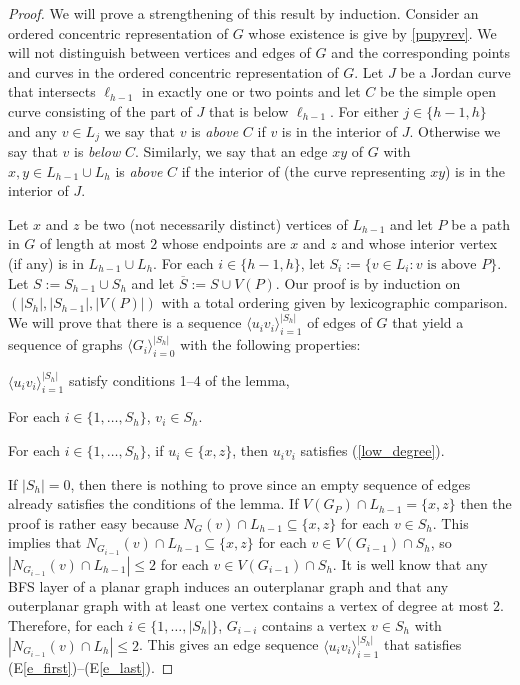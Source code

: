 \documentclass{patmorin}
\begin{document}
\begin{proof}
  We will prove a strengthening of this result by induction.  Consider an ordered concentric representation of $G$ whose existence is give by \cref{pupyrev}.  We will not distinguish between vertices and edges of $G$ and the corresponding points and curves in the ordered concentric representation of $G$. Let $J$ be a Jordan curve that intersects $\ell_{h-1}$ in exactly one or two points and let $C$ be the simple open curve consisting of the part of $J$ that is below $\ell_{h-1}$.  For either $j\in\{h-1,h\}$ and any $v\in L_j$ we say that $v$ is \emph{above} $C$ if $v$ is in the interior of $J$. Otherwise we say that $v$ is \emph{below} $C$.  Similarly, we say that an edge $xy$ of $G$ with $x,y\in L_{h-1}\cup L_h$ is \emph{above} $C$ if the interior of (the curve representing $xy$) is in the interior of $J$.

  Let $x$ and $z$ be two (not necessarily distinct) vertices of $L_{h-1}$ and let $P$ be a path in $G$ of length at most $2$ whose endpoints are $x$ and $z$ and whose interior vertex (if any) is in $L_{h-1}\cup L_h$. For each $i\in\{h-1,h\}$, let $S_i:=\{v\in L_i:\mbox{$v$ is above $P$}\}$.  Let $S:=S_{h-1}\cup S_{h}$ and let $\overline{S}:=S\cup V(P)$. Our proof is by induction on $(|S_h|,|S_{h-1}|,|V(P)|)$ with a total ordering given by lexicographic comparison.   We will prove that there is a sequence $\langle u_iv_i\rangle_{i=1}^{|S_h|}$ of edges of $G$ that yield a sequence of graphs $\langle G_i\rangle_{i=0}^{|S_h|}$ with the following properties:
  \begin{compactenum}[(E1)]
    \item \label{e_first}\label{original_conditions} $\langle u_iv_i\rangle_{i=1}^{|S_h|}$ satisfy conditions 1--4 of the lemma,
    \item For each $i\in\{1,\ldots,S_h\}$, $v_i\in S_h$.
    \item \label{e_last} For each $i\in\{1,\ldots,S_h\}$, if $u_i\in\{x,z\}$, then $u_iv_i$ satisfies (\ref{low_degree}). 
  \end{compactenum}


  If $|S_h|=0$, then there is nothing to prove since an empty sequence of edges already satisfies the conditions of the lemma.  If $V(G_P)\cap L_{h-1}=\{x,z\}$ then the proof is rather easy because $N_G(v)\cap L_{h-1}\subseteq \{x,z\}$ for each $v\in S_h$.  This implies that $N_{G_{i-1}}(v)\cap L_{h-1}\subseteq\{x,z\}$ for each $v\in V(G_{i-1})\cap S_h$, so $|N_{G_{i-1}}(v)\cap L_{h-1}|\le 2$ for each $v\in V(G_{i-1})\cap S_h$.  It is well know that any BFS layer of a planar graph induces an outerplanar graph and that any outerplanar graph with at least one vertex contains a vertex of degree at most $2$.  Therefore, for each $i\in\{1,\ldots,|S_h|\}$, $G_{i-i}$ contains a vertex $v\in S_h$ with $|N_{G_{i-1}}(v)\cap L_h|\le 2$.  This gives an edge sequence $\langle u_iv_i\rangle_{i=1}^{|S_h|}$ that satisfies (E\ref{e_first})--(E\ref{e_last}).


\end{proof}
\end{document}
